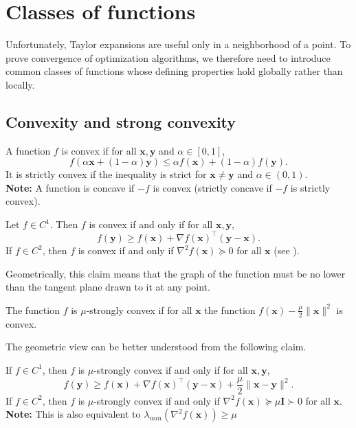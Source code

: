 \section{Classes of functions}

Unfortunately, Taylor expansions are useful only in a neighborhood of a point. To prove
convergence of optimization algorithms, we therefore need to introduce common classes
of functions whose defining properties hold globally rather than locally.
\subsection{Convexity and strong convexity}
\label{sec:ch1-convexity}

\begin{definition}
\label{def:ch1-convex-function}
A function $f$ is convex if for all $\mathbf{x},\mathbf{y}$ and $\alpha\in[0,1]$,
\[
  f(\alpha \mathbf{x}+(1-\alpha)\mathbf{y})
  \le \alpha f(\mathbf{x})+(1-\alpha)f(\mathbf{y}).
\]
It is strictly convex if the inequality is strict for $\mathbf{x}\ne \mathbf{y}$ and
$\alpha\in(0,1)$.\\
\noindent \textbf{Note:} A function is concave if $-f$ is convex (strictly concave if
$-f$ is strictly convex).
\end{definition}


\begin{claim}
\label{clm:ch1-diff-convexity}
Let $f \in C^{1}$. Then $f$ is convex if and only if for all $\mathbf{x}, \mathbf{y}$,
\[
f(\mathbf{y}) \geq f(\mathbf{x})+\nabla f(\mathbf{x})^{\top}(\mathbf{y}-\mathbf{x}) .
\]
If $f \in C^{2}$, then $f$ is convex if and only if $\nabla^{2} f(\mathbf{x}) 
\succeq 0$ for all $\mathbf{x}$ (see ). 
\end{claim}

Geometrically, this claim means that the graph of the function must be no lower than
the tangent plane drawn to it at any point.


\begin{definition}
The function $f$ is $\mu$-strongly convex if for all $\mathbf{x}$ the function 
$f(\mathbf{x})-\frac{\mu}{2}\|\mathbf{x}\|^{2}$ is convex.
\end{definition}

The geometric view can be better understood from the following claim.
\begin{claim}\label{clm:diff-strong-conv}
If $f \in C^{1}$, then $f$ is $\mu$-strongly convex if and only if for 
all $\mathbf{x}, \mathbf{y}$,
\[
f(\mathbf{y}) \geq f(\mathbf{x})+\nabla f(\mathbf{x})^{\top}(\mathbf{y}-\mathbf{x})
+\frac{\mu}{2}\|\mathbf{x}-\mathbf{y}\|^{2} .
\]
If $f \in C^{2}$, then $f$ is $\mu$-strongly convex if and only if
$\nabla^{2} f(\mathbf{x}) \succeq \mu \mathbf{I} \succ 0$ for all $\mathbf{x}$.\\
\noindent \textbf{Note:} This is also equivalent to $\lambda_{min}
(\nabla^2f(\mathbf{x} ))\ge \mu$
\end{claim}

